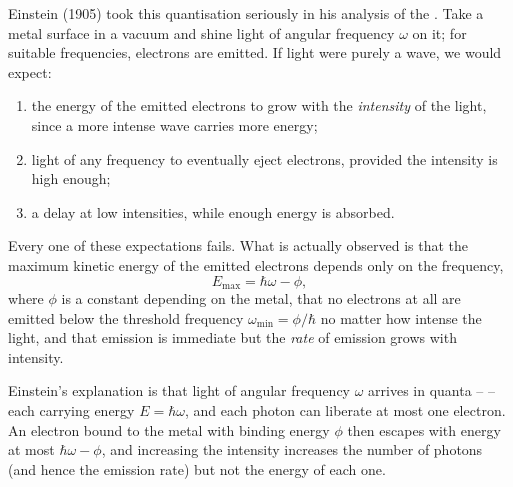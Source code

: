 \documentclass[a4paper]{scrartcl}
\begin{document}
Einstein (1905) took this quantisation seriously in his analysis of the . Take a metal surface in a vacuum and shine light of angular frequency $\omega$ on it; for suitable frequencies, electrons are emitted. If light were purely a wave, we would expect:
\begin{enumerate}[label=(\roman*)]
    \item the energy of the emitted electrons to grow with the \emph{intensity} of the light, since a more intense wave carries more energy;
    \item light of any frequency to eventually eject electrons, provided the intensity is high enough;
    \item a delay at low intensities, while enough energy is absorbed.
\end{enumerate}
Every one of these expectations fails. What is actually observed is that the maximum kinetic energy of the emitted electrons depends only on the frequency,
$$
E_{\max} = \hbar \omega - \phi,
$$
where $\phi$ is a constant depending on the metal, that no electrons at all are emitted below the threshold frequency $\omega_{\min} = \phi/\hbar$ no matter how intense the light, and that emission is immediate but the \emph{rate} of emission grows with intensity.

\begin{center}
\end{center}

Einstein's explanation is that light of angular frequency $\omega$ arrives in quanta --  -- each carrying energy $E = \hbar \omega$, and each photon can liberate at most one electron. An electron bound to the metal with binding energy $\phi$ then escapes with energy at most $\hbar \omega - \phi$, and increasing the intensity increases the number of photons (and hence the emission rate) but not the energy of each one.
\end{document}

